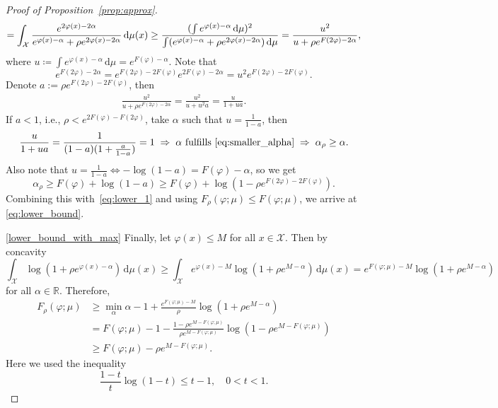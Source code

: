 \documentclass[10pt,a4paper]{amsart}
\newcommand{\R}{\mathbb{R}}
\def\cX{\mathcal{X}}
\newcommand{\dd}{\,\mathrm{d}}
\newcommand*{\eqset}{\coloneqq}
\begin{document}
\begin{proof}[Proof of Proposition~\ref{prop:approx}]
\begin{equation*}
        = \int_{ {\cX}} \frac{e^{2\varphi(x) - 2\alpha}}{e^{\varphi(x) - \alpha} + \rho e^{2\varphi(x) - 2\alpha}} \dd \mu(x) \geq \frac{(\int e^{\varphi(x) - \alpha} \dd \mu)^2}{\int (e^{\varphi(x) - \alpha} + \rho e^{2\varphi(x) - 2\alpha}) \dd \mu} \\
        = \frac{u^2}{u+\rho e^{F(2\varphi) - 2\alpha}},
    \end{equation*}
    where \(u \eqset \int e^{\varphi(x) - \alpha} \dd \mu = e^{F(\varphi) - \alpha}\). Note that
    \[
        e^{F(2\varphi) - 2\alpha} = e^{F(2\varphi) - 2F(\varphi)}e^{2F(\varphi) - 2\alpha} = u^2 e^{F(2\varphi) - 2F(\varphi)}.
    \]
    Denote \(a := \rho e^{F(2\varphi) - 2F(\varphi)}\), then
    \begin{align*}
        \frac{u^2}{u+\rho e^{F(2\varphi) - 2\alpha}} = \frac{u^2}{u + u^2 a} = \frac{u}{1+ua}.
    \end{align*}
    If $a<1$, i.e., $\rho < e^{2F(\varphi) - F(2\varphi)}$, take \(\alpha\) such that \(u = \frac{1}{1-a}\), then
    \[
        \frac{u}{1+ua} = \frac{1}{(1-a)(1+\frac{a}{1-a})} = 1\; \Rightarrow\; \alpha \text{ fulfills } \eqref{eq:smaller_alpha}\; \Rightarrow\; \alpha_\rho \geq \alpha.
    \]
    Also note that \(u = \frac{1}{1-a} \iff - \log(1-a) = F(\varphi)-\alpha\), so we get
    \begin{equation}\label{lower_alph}
        \alpha_\rho \geq F(\varphi) + \log(1-a) \geq F(\varphi) + \log(1-\rho e^{F(2\varphi) - 2F(\varphi)}).
    \end{equation}
    Combining this with~\eqref{eq:lower_1} 
    and using \(F_\rho(\varphi; \mu) \leq F(\varphi; \mu)\), 
    we arrive at \eqref{eq:lower_bound}.

    \ref{lower_bound_with_max} Finally, let $\varphi(x) \le M$ for all $x \in \cX$. Then by concavity 
    \[
    \int_{ {\cX}} \log\left(1 + \rho e^{\varphi(x) - \alpha}\right) \dd \mu(x) 
    \ge \int_{ {\cX}} e^{\varphi(x) - M} \log\left(1 + \rho e^{M - \alpha}\right) \dd \mu(x)
    = e^{F(\varphi; \mu) - M} \log\left(1 + \rho e^{M - \alpha}\right)
    \]
    for all $\alpha \in \R$. Therefore,
    \begin{align*}
        F_\rho(\varphi ; \mu) &\ge \min_\alpha \alpha - 1 + \frac{e^{F(\varphi; \mu) - M}}{\rho} \log\left(1 + \rho e^{M - \alpha}\right) \\
        &= F(\varphi; \mu) - 1 - \frac{1 - \rho e^{M - F(\varphi; \mu)}}{\rho e^{M - F(\varphi; \mu)}} \log\left(1 - \rho e^{M - F(\varphi; \mu)}\right) \\
        &\ge F(\varphi; \mu) - \rho e^{M - F(\varphi; \mu)} .
    \end{align*}
    Here we used the inequality 
    \[
    \frac{1 - t}{t} \log(1 - t) \le t - 1, \quad 0 < t < 1 .
    \]
\end{proof}
\end{document}
